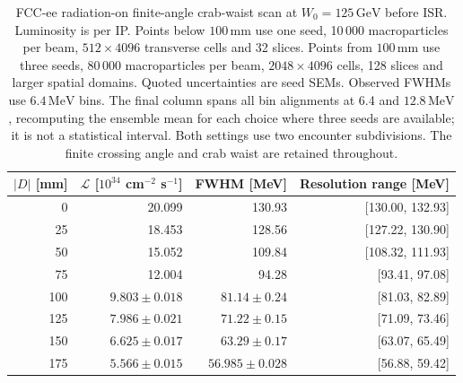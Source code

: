 \begin{table}[htbp]
\centering\small
\caption{FCC-ee radiation-on finite-angle crab-waist scan at $W_0=125\,\mathrm{GeV}$ before ISR. Luminosity is per IP. Points below $100\,\mathrm{mm}$ use one seed, 10\,000 macroparticles per beam, $512\times4096$ transverse cells and 32 slices. Points from $100\,\mathrm{mm}$ use three seeds, 80\,000 macroparticles per beam, $2048\times4096$ cells, 128 slices and larger spatial domains. Quoted uncertainties are seed SEMs. Observed FWHMs use $6.4\,\mathrm{MeV}$ bins. The final column spans all bin alignments at 6.4 and $12.8\,\mathrm{MeV}$, recomputing the ensemble mean for each choice where three seeds are available; it is not a statistical interval. Both settings use two encounter subdivisions. The finite crossing angle and crab waist are retained throughout.}
\label{tab:fcc-luminosity}
\begin{tabular}{@{}rrrr@{}}
\toprule
$|D|$ [mm] & $\mathcal L$ [$10^{34}$ cm$^{-2}$ s$^{-1}$] & FWHM [MeV] & Resolution range [MeV]\\
\midrule
0 & 20.099 & 130.93 & [130.00, 132.93]\\
25 & 18.453 & 128.56 & [127.22, 130.90]\\
50 & 15.052 & 109.84 & [108.32, 111.93]\\
75 & 12.004 & 94.28 & [93.41, 97.08]\\
100 & $9.803\pm0.018$ & $81.14\pm0.24$ & [81.03, 82.89]\\
125 & $7.986\pm0.021$ & $71.22\pm0.15$ & [71.09, 73.46]\\
150 & $6.625\pm0.017$ & $63.29\pm0.17$ & [63.07, 65.49]\\
175 & $5.566\pm0.015$ & $56.985\pm0.028$ & [56.88, 59.42]\\
\bottomrule
\end{tabular}
\end{table}
